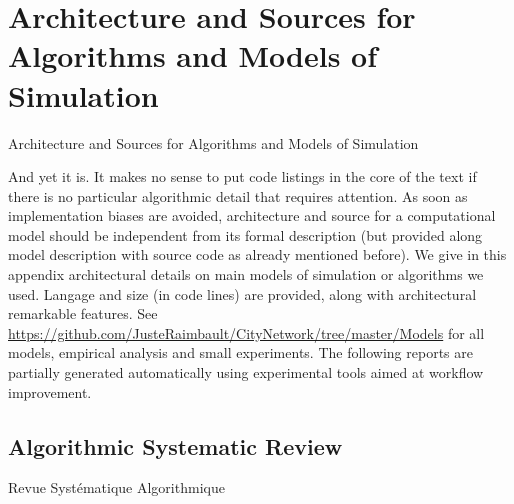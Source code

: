 


\chapter{Architecture and Sources for Algorithms and Models of Simulation}{Architecture and Sources for Algorithms and Models of Simulation} %

\label{app:code} %










And yet it is. It makes no sense to put code listings in the core of the text if there is no particular algorithmic detail that requires attention. As soon as implementation biases are avoided, architecture and source for a computational model should be independent from its formal description (but provided along model description with source code as already mentioned before). We give in this appendix architectural details on main models of simulation or algorithms we used. Langage and size (in code lines) are provided, along with architectural remarkable features. See \url{https://github.com/JusteRaimbault/CityNetwork/tree/master/Models} for all models, empirical analysis and small experiments. The following reports are partially generated automatically using experimental tools aimed at workflow improvement.




\section{Algorithmic Systematic Review}{Revue Systématique Algorithmique}

